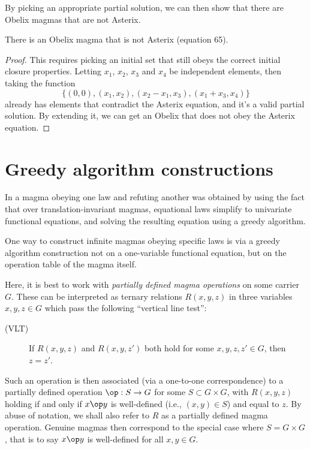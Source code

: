 By picking an appropriate partial solution, we can then show that there are Obelix magmas that are not Asterix.
\begin{corollary}
There is an Obelix magma that is not Asterix (equation 65).
\end{corollary}
\begin{proof}
This requires picking an initial set that still obeys the correct initial closure properties. Letting
$x_1$, $x_2$, $x_3$ and $x_4$ be independent elements, then taking the function
$$\{(0,0), (x_1,x_2), (x_2-x_1, x_3), (x_1+x_3, x_4)\}$$
already has elements that contradict the Asterix equation, and it's a valid partial solution. By extending
it, we can get an Obelix that does not obey the Asterix equation.
\end{proof}

\section{Greedy algorithm constructions}\label{greedy-section}

In  a magma obeying one law and refuting another was obtained by using the
fact that over translation-invariant magmas, equational laws simplify to univariate functional equations,
and solving the resulting equation using a greedy algorithm.

One way to construct infinite magmas obeying specific laws is via a greedy algorithm construction not on a
one-variable functional equation, but on the operation table of the magma itself.

Here, it is best to work with \emph{partially defined magma operations} on some carrier $G$.  These can be interpreted as ternary relations $R(x,y,z)$ in three variables $x,y,z \in G$ which pass the following ``vertical line test'':

\begin{description}
  \item[(VLT)] If $R(x,y,z)$ and $R(x,y,z')$ both hold for some $x,y,z,z' \in G$, then $z=z'$.
\end{description}

Such an operation is then associated (via a one-to-one correspondence) to a partially defined operation $\op : S \to G$ for some $S \subset G \times G$, with $R(x,y,z)$ holding if and only if $x \op y$ is well-defined (i.e., $(x,y) \in S$) and equal to $z$.  By abuse of notation, we shall also refer to $R$ as a partially defined magma operation.  Genuine magmas then correspond to the special case where $S = G \times G$, that is to say $x \op y$ is well-defined for all $x,y \in G$.

